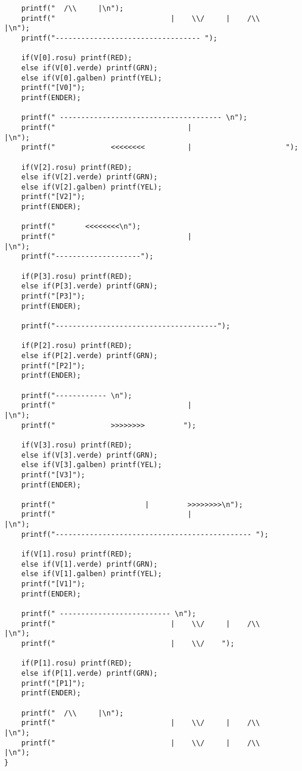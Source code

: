 \documentclass[a4paper, 11pt]{article}
\begin{document}
{\begin{verbatim}
    printf("  /\\     |\n");
    printf("	                       |    \\/     |    /\\     |\n");
    printf("---------------------------------- ");
 
    if(V[0].rosu) printf(RED);
	else if(V[0].verde) printf(GRN);
	else if(V[0].galben) printf(YEL);
    printf("[V0]");
    printf(ENDER);
 
    printf(" -------------------------------------- \n");
    printf("                               |                       |\n");
    printf("             <<<<<<<<          |                      ");
 
    if(V[2].rosu) printf(RED);
	else if(V[2].verde) printf(GRN);
	else if(V[2].galben) printf(YEL);
    printf("[V2]");
    printf(ENDER);
 
    printf("       <<<<<<<<\n");
    printf("                               |                       |\n");
    printf("--------------------");
 
    if(P[3].rosu) printf(RED);
	else if(P[3].verde) printf(GRN);
    printf("[P3]");
    printf(ENDER);
 
    printf("--------------------------------------");
 
    if(P[2].rosu) printf(RED);
	else if(P[2].verde) printf(GRN);
    printf("[P2]");
    printf(ENDER);
 
    printf("------------ \n");
    printf("                               |                       |\n");
    printf("             >>>>>>>>         ");
 
    if(V[3].rosu) printf(RED);
	else if(V[3].verde) printf(GRN);
	else if(V[3].galben) printf(YEL);
    printf("[V3]");
    printf(ENDER);
 
    printf("                     |         >>>>>>>>\n");
    printf("                               |                       |\n");
    printf("---------------------------------------------- ");
 
    if(V[1].rosu) printf(RED);
	else if(V[1].verde) printf(GRN);
	else if(V[1].galben) printf(YEL);
    printf("[V1]");
    printf(ENDER);
 
    printf(" -------------------------- \n");
    printf("	                       |    \\/     |    /\\     |\n");
    printf("	                       |    \\/    ");
 
    if(P[1].rosu) printf(RED);
	else if(P[1].verde) printf(GRN);
    printf("[P1]");
    printf(ENDER);
 
    printf("  /\\     |\n");
    printf("	                       |    \\/     |    /\\     |\n");
    printf("	                       |    \\/     |    /\\     |\n");
}
\end{verbatim}
}
\end{document}
